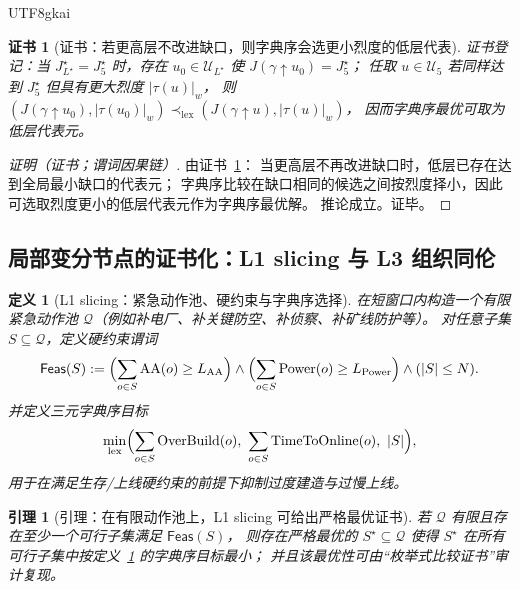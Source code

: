 \documentclass[12pt]{article}
\newtheorem{definition}{定义}[section]
\newtheorem{lemma}{引理}[section]
\newtheorem{Certificate}{证书}[section]
\begin{document}
\begin{CJK*}{UTF8}{gkai}
\begin{Certificate}[证书：若更高层不改进缺口，则字典序会选更小烈度的低层代表]
\label{cert:openra-lexicographic-implies-low-level-first}
证书登记：当 $J_{L^\star}^\star=J_5^\star$ 时，存在 $u_0\in\mathcal{U}_{L^\star}$ 使 $J(\gamma\uparrow u_0)=J_5^\star$；
任取 $u\in\mathcal{U}_5$ 若同样达到 $J_5^\star$ 但具有更大烈度 $|\tau(u)|_w$，
则 $(J(\gamma\uparrow u_0),|\tau(u_0)|_w)\prec_{\mathrm{lex}}(J(\gamma\uparrow u),|\tau(u)|_w)$，
因而字典序最优可取为低层代表元。
\end{Certificate}

\begin{proof}[证明（证书；谓词因果链）]
由证书~\ref{cert:openra-lexicographic-implies-low-level-first}：
当更高层不再改进缺口时，低层已存在达到全局最小缺口的代表元；
字典序比较在缺口相同的候选之间按烈度择小，因此可选取烈度更小的低层代表元作为字典序最优解。
推论成立。证毕。
\end{proof}

\subsection{局部变分节点的证书化：L1 slicing 与 L3 组织同伦}
\label{sec:openra-variational-local-certificates}

\begin{definition}[L1 slicing：紧急动作池、硬约束与字典序选择]
\label{def:openra-l1-slicing}
在短窗口内构造一个有限紧急动作池 $\mathcal{Q}$（例如补电厂、补关键防空、补侦察、补矿线防护等）。
对任意子集 $S\subseteq\mathcal{Q}$，定义硬约束谓词
\[
  \mathsf{Feas}(S):=
  \Bigl(\sum_{o\in S}\mathrm{AA}(o)\ge L_{\mathrm{AA}}\Bigr)
  \wedge
  \Bigl(\sum_{o\in S}\mathrm{Power}(o)\ge L_{\mathrm{Power}}\Bigr)
  \wedge
  (|S|\le N).
\]
并定义三元字典序目标
\[
  \min_{\mathrm{lex}}
  \Bigl(
    \sum_{o\in S}\mathrm{OverBuild}(o),\
    \sum_{o\in S}\mathrm{TimeToOnline}(o),\
    |S|
  \Bigr),
\]
用于在满足生存/上线硬约束的前提下抑制过度建造与过慢上线。
\end{definition}

\begin{lemma}[引理：在有限动作池上，L1 slicing 可给出严格最优证书]
\label{lem:openra-l1-slicing-optimal-certificate}
若 $\mathcal{Q}$ 有限且存在至少一个可行子集满足 $\mathsf{Feas}(S)$，
则存在严格最优的 $S^\star\subseteq\mathcal{Q}$ 使得
$S^\star$ 在所有可行子集中按定义~\ref{def:openra-l1-slicing} 的字典序目标最小；
并且该最优性可由“枚举式比较证书”审计复现。
\end{lemma}


\end{CJK*}
\end{document}
